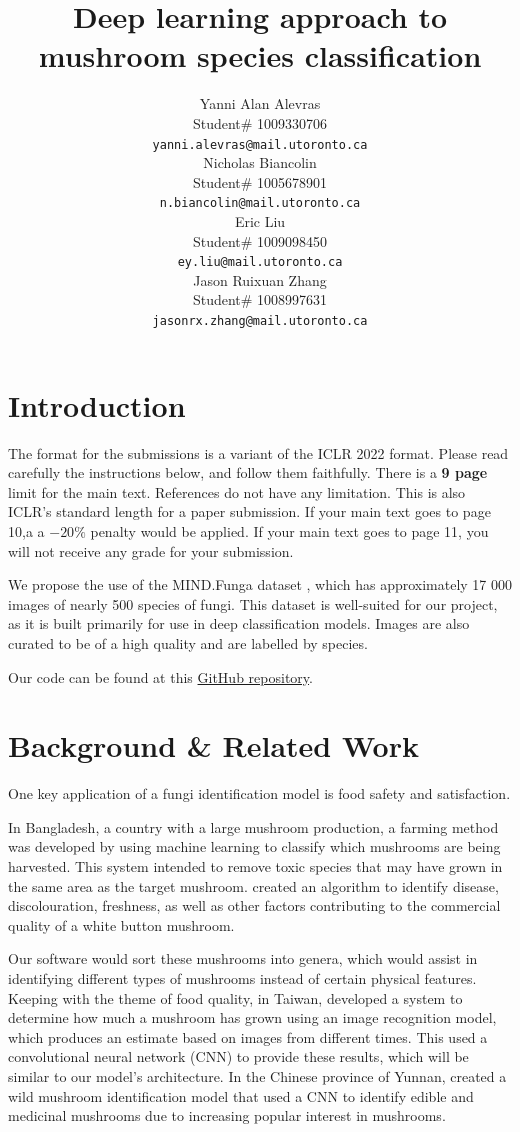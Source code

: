 \documentclass{article} %
\title{Deep learning approach to  \\ 
mushroom species classification}
\author{Yanni Alan Alevras  \\
Student\# 1009330706 \\
\texttt{yanni.alevras@mail.utoronto.ca} \\
\And
Nicholas Biancolin  \\
Student\# 1005678901 \\
\texttt{n.biancolin@mail.utoronto.ca} \\
\AND
Eric Liu  \\
Student\# 1009098450 \\
\texttt{ey.liu@mail.utoronto.ca} \\
\And
Jason Ruixuan Zhang \\
Student\# 1008997631 \\
\texttt{jasonrx.zhang@mail.utoronto.ca} \\
\AND
}
\begin{document}
\maketitle

\section{Introduction}
\label{intro}

The format for the submissions is a variant of the ICLR 2022 format.
Please read carefully the instructions below, and follow them
faithfully. There is a \textbf{9 page} limit for the main text. References do not have any limitation. This is also ICLR's standard length for a paper submission. 
If your main text goes to page 10,a a $-20\%$ penalty would be applied. If your main text goes to page 11, you will not receive any grade for your submission. 

We propose the use of the MIND.Funga dataset \citep{Drechsler-SantosKarstedtEtAl.MINDFunga.2023}, which has approximately 17 000 images of nearly 500 species of fungi. This dataset is well-suited for our project, as it is built primarily for use in deep classification models. Images are also curated to be of a high quality and are labelled by species.

Our code can be found at this \href{https://github.com/nbiancolin/convolutional-neural-nuts}{GitHub repository}.

\section{Background \& Related Work}
\label{bg_related}

One key application of a fungi identification model is food safety and satisfaction.

In Bangladesh, a country with a large mushroom production, a farming method was developed by \cite{RahmanFaruqEtAl.IoTEnabledMushroom.2022} using machine learning to classify which mushrooms are being harvested. This system intended to remove toxic species that may have grown in the same area as the target mushroom. \cite{WangZhengEtAl.AutomaticSortingSystem.2018} created an algorithm to identify disease, discolouration, freshness, as well as other factors contributing to the commercial quality of a white button mushroom.

Our software would sort these mushrooms into genera, which would assist in identifying different types of mushrooms instead of certain physical features. Keeping with the theme of food quality, in Taiwan, \cite{LuLiawEtAl.DevelopmentMushroomGrowth.2019} developed a system to determine how much a mushroom has grown using an image recognition model, which produces an estimate based on images from different times. This used a convolutional neural network (CNN) to provide these results, which will be similar to our model's architecture. In the Chinese province of Yunnan, \cite{H.ZhaoF.GeEtAl.IdentificationWildMushroom.2021} created a wild mushroom identification model that used a CNN to identify edible and medicinal mushrooms due to increasing popular interest in mushrooms.
\end{document}
